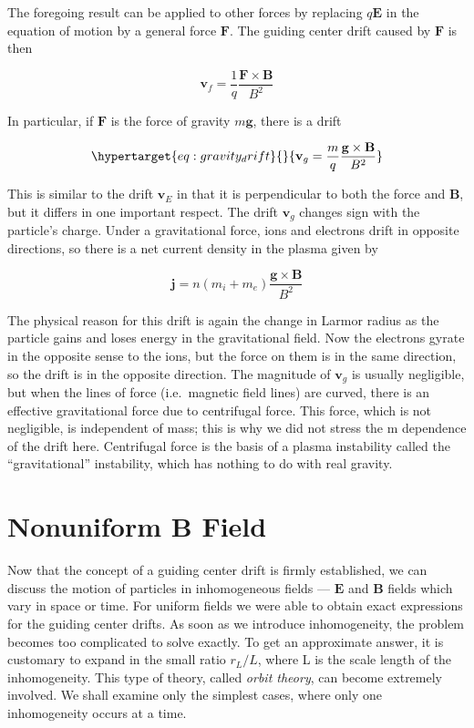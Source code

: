 \documentclass[
  notoc %
]{tufte-book}
\begin{document}
The foregoing result can be applied to other forces by replacing
\(q\mathbf{E}\) in the equation of motion by a general force
\(\mathbf{F}\). The guiding center drift caused by \(\mathbf{F}\) is
then

\[
\mathbf{v}_f = \frac{1}{q}\frac{\mathbf{F}\times\mathbf{B}}{B^2}
\]

In particular, if \(\mathbf{F}\) is the force of gravity
\(m\mathbf{g}\), there is a drift

\begin{equation}\protect\hypertarget{eq:gravity_drift}{}{
\mathbf{v}_g = \frac{m}{q}\frac{\mathbf{g}\times\mathbf{B}}{B^2}
}\label{eq:gravity_drift}\end{equation}

This is similar to the drift \(\mathbf{v}_E\) in that it is
perpendicular to both the force and \(\mathbf{B}\), but it differs in
one important respect. The drift \(\mathbf{v}_g\) changes sign with the
particle's charge. Under a gravitational force, ions and electrons drift
in opposite directions, so there is a net current density in the plasma
given by

\[
\mathbf{j} = n(m_i+m_e)\frac{\mathbf{g}\times\mathbf{B}}{B^2}
\]

The physical reason for this drift is again the change in Larmor radius
as the particle gains and loses energy in the gravitational field. Now
the electrons gyrate in the opposite sense to the ions, but the force on
them is in the same direction, so the drift is in the opposite
direction. The magnitude of \(\mathbf{v}_g\) is usually negligible, but
when the lines of force (i.e.~magnetic field lines) are curved, there is
an effective gravitational force due to centrifugal force. This force,
which is not negligible, is independent of mass; this is why we did not
stress the m dependence of the drift here. Centrifugal force is the
basis of a plasma instability called the ``gravitational'' instability,
which has nothing to do with real gravity.

\hypertarget{nonuniform-b-field}{%
\section{Nonuniform B Field}\label{nonuniform-b-field}}

Now that the concept of a guiding center drift is firmly established, we
can discuss the motion of particles in inhomogeneous fields ---
\(\mathbf{E}\) and \(\mathbf{B}\) fields which vary in space or time.
For uniform fields we were able to obtain exact expressions for the
guiding center drifts. As soon as we introduce inhomogeneity, the
problem becomes too complicated to solve exactly. To get an approximate
answer, it is customary to expand in the small ratio \(r_L/L\), where L
is the scale length of the inhomogeneity. This type of theory, called
\emph{orbit theory}, can become extremely involved. We shall examine
only the simplest cases, where only one inhomogeneity occurs at a time.
\end{document}
